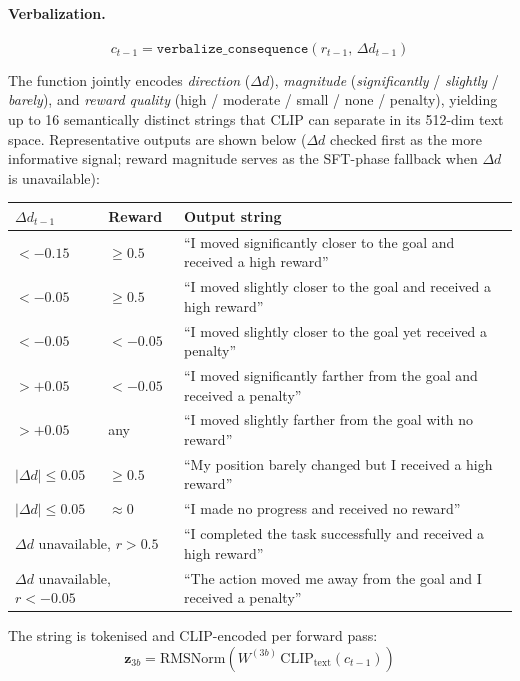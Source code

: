 \documentclass{article}
\renewcommand{\arraystretch}{1.25}
\begin{document}
\paragraph{Verbalization.}
\begin{equation}
  c_{t-1} = \texttt{verbalize\_consequence}(r_{t-1},\,\Delta d_{t-1})
\end{equation}

The function jointly encodes \emph{direction} ($\Delta d$),
\emph{magnitude} (\textit{significantly} / \textit{slightly} / \textit{barely}),
and \emph{reward quality} (high / moderate / small / none / penalty),
yielding up to 16 semantically distinct strings that CLIP can separate in
its 512-dim text space.
Representative outputs are shown below ($\Delta d$ checked first as the
more informative signal; reward magnitude serves as the SFT-phase fallback
when $\Delta d$ is unavailable):

\vspace{4pt}
\begin{center}
\small
\renewcommand{\arraystretch}{1.15}
\begin{tabular}{lll}
\toprule
$\Delta d_{t-1}$ & Reward & Output string \\
\midrule
$<{-}0.15$ & ${\ge}0.5$  & ``I moved significantly closer to the goal and received a high reward'' \\
$<{-}0.05$ & ${\ge}0.5$  & ``I moved slightly closer to the goal and received a high reward'' \\
$<{-}0.05$ & ${<}{-}0.05$& ``I moved slightly closer to the goal yet received a penalty'' \\
$>{+}0.05$ & ${<}{-}0.05$& ``I moved significantly farther from the goal and received a penalty'' \\
$>{+}0.05$ & any         & ``I moved slightly farther from the goal with no reward'' \\
$|\Delta d|\le0.05$ & ${\ge}0.5$ & ``My position barely changed but I received a high reward'' \\
$|\Delta d|\le0.05$ & ${\approx}0$ & ``I made no progress and received no reward'' \\
\multicolumn{2}{l}{$\Delta d$ unavailable, $r{>}0.5$} & ``I completed the task successfully and received a high reward'' \\
\multicolumn{2}{l}{$\Delta d$ unavailable, $r{<}{-}0.05$} & ``The action moved me away from the goal and I received a penalty'' \\
\bottomrule
\end{tabular}
\end{center}
\vspace{4pt}
The string is tokenised and CLIP-encoded per forward pass:
\begin{equation}
  \mathbf{z}_{3b} = \mathrm{RMSNorm}(W^{(3b)}\,\mathrm{CLIP}_{\mathrm{text}}(c_{t-1}))
  \label{eq:experience_enc}
\end{equation}
\end{document}
